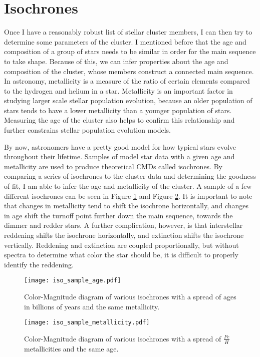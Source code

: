 \documentclass[aps,prb,twocolumn,groupedaddress,nofootinbib,floatfix]{revtex4-1}
\begin{document}
\section*{Isochrones}
Once I have a reasonably robust list of stellar cluster members, I can then try to determine some parameters of the cluster. I mentioned before that the age and composition of a group of stars needs to be similar in order for the main sequence to take shape. Because of this, we can infer properties about the age and composition of the cluster, whose members construct a connected main sequence. In astronomy, metallicity is a measure of the ratio of certain elements compared to the hydrogen and helium in a star. Metallicity is an important factor in studying larger scale stellar population evolution, because an older population of stars tends to have a lower metallicity than a younger population of stars. Measuring the age of the cluster also helps to confirm this relationship and further constrains stellar population evolution models.

By now, astronomers have a pretty good model for how typical stars evolve throughout their lifetime. Samples of model star data with a given age and metallicity are used to produce theoretical CMDs called isochrones. By comparing a series of isochrones to the cluster data and determining the goodness of fit, I am able to infer the age and metallicity of the cluster. A sample of a few different isochrones can be seen in Figure \ref{fig:Isochrone_Sample_Age} and Figure \ref{fig:Isochrone_Sample_Metallicity}. It is important to note that changes in metallicity tend to shift the isochrone horizontally, and changes in age shift the turnoff point further down the main sequence, towards the dimmer and redder stars. A further complication, however, is that interstellar reddening shifts the isochrone horizontally, and extinction shifts the isochrone vertically. Reddening and extinction are coupled proportionally, but without spectra to determine what color the star should be, it is difficult to properly identify the reddening.

\begin{figure}[!h]
	\centering
      \texttt{[image: iso\_sample\_age.pdf]}
	\caption{Color-Magnitude diagram of various isochrones with a spread of ages in billions of years and the same metallicity.}
	\label{fig:Isochrone_Sample_Age}
\end{figure}

\begin{figure}[!h]
	\centering
      \texttt{[image: iso\_sample\_metallicity.pdf]}
	\caption{Color-Magnitude diagram of various isochrones with a spread of $\frac{Fe}{H}$ metallicities and the same age.}
	\label{fig:Isochrone_Sample_Metallicity}
\end{figure}
\end{document}
